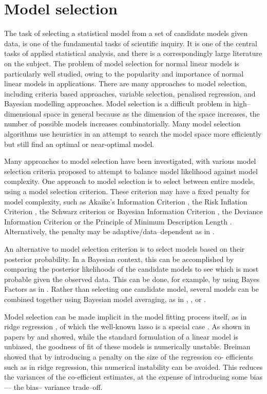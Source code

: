 \documentclass{amsart}[12pt]
\begin{document}
\section{Model selection}
The task of selecting a statistical model from a set of candidate models given data, is one
of the fundamental tasks of scientific inquiry. It is one of the central tasks of applied statistical
analysis, and there is a correspondingly large literature on the subject. The problem of model selection for
normal linear models is particularly well studied, owing to the popularity and importance of normal linear
models in applications.
There are many approaches to model selection, including criteria based approaches,
variable selection,
penalised regression,
and Bayesian modelling approaches. Model selection is a difficult problem in high--dimensional space in general
because as the dimension of the space increases, the number of possible models increases combinatorially.
Many model selection algorithms use heuristics in an attempt to search the model space more efficiently but
still find an optimal or near-optimal model.

Many approaches to model selection have been investigated, with various model selection criteria
proposed to attempt to balance model likelihood against model complexity. One approach to model selection is
to select between entire models, using a model selection criterion. These criterion may have a fixed penalty
for model complexity, such as Akaike's Information Criterion \citep{Akaike1974}, the Risk Inflation Criterion
\citep{Foster1994}, the Schwarz criterion or Bayesian Information Criterion \citep{Schwarz1978}, the Deviance
Information Criterion \citep{Spiegelhalter2016} or the Principle of Minimum Description Length
\citep{Hansen2001}. Alternatively, the penalty may be adaptive/data--dependent as in \citep{George2000}.

An alternative to model selection criterion is to select models based on their posterior probability. In a Bayesian context, this can be
accomplished by comparing the posterior likelihoods of the candidate models to see which is most probable
given the observed data. This can be done, for example, by using Bayes Factors as in \citep{Kass1993}. Rather
than selecting one candidate model, several models can be combined together using Bayesian model  averaging,
as in \citep{Hoeting1999}, \citep{Raftery1997}, \citep{Fernandez2001} or \citep{Papaspiliopoulos2016}.

Model selection can be made implicit in the model fitting process itself, as in ridge regression
\citep{Casella1980}, of which the well-known lasso is a special case \citep{Tibshirani1996}. As shown in
papers by \citep{Breiman1996} and \citep{Efron2013} showed, while  the standard formulation of a linear model
is unbiased, the goodness of fit of these models is numerically  unstable. Breiman showed that by introducing
a penalty on the size of the regression co- efficients such as  in ridge regression, this numerical
instability can be avoided. This reduces the variances of the co-efficient estimates, at the expense of
introducing some bias --- the bias-- variance trade--off.
\end{document}
